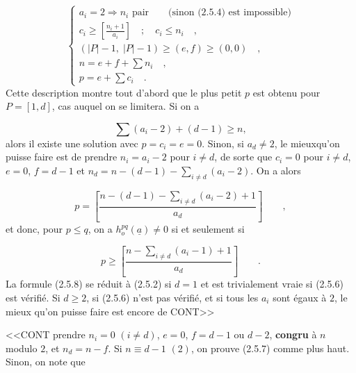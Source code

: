 
\begin{equation}\tag{2.5.5}
\left\{
\begin{array}{l}
a_i = 2 \Longrightarrow n_i \mbox{ pair} \qquad \mbox{(sinon (2.5.4) est impossible)} \\[3mm]
c_i \geq \left[ \displaystyle\frac{n_i+1}{a_i} \right] \quad ; \quad c_i \leq n_i \quad , \\[3mm]
(|P|-1, \; |P|-1) \geq (e,f) \geq (0,0) \quad , \\[3mm]
n = e+f+ \sum n_i \quad , \\[3mm]
p = e + \sum c_i \quad .
\end{array}
\right.
\end{equation}
Cette description montre tout d'abord que le plus petit $p$ est obtenu pour $P = [1,d]$, cas auquel on se limitera. Si on a

\begin{equation}\tag{2.5.6}
\sum (a_i-2) + (d-1) \geq n,
\end{equation}
alors il existe une solution avec $p = c_i = e = 0$. Sinon, si $a_d \neq 2$, le mieuxqu'on puisse faire est de prendre $n_i = a_i - 2$ pour $i \neq d$, de sorte que $c_i = 0$ pour $i \neq d$, $e = 0$, $f = d-1$ et $n_d = n - (d-1) - \sum\limits_{i \neq d} (a_i-2)$. On a alors

\begin{equation}\tag{2.5.7}
p = \left[ \displaystyle\frac{n-(d-1) - \sum\limits_{i \neq d} (a_i-2) + 1}{a_d} \right] \qquad ,
\end{equation}
et donc, pour $p \leq q$, on a $h^{pq}_{o}(\underline{a}) \neq 0$ si et seulement si

\begin{equation}\tag{2.5.8}
p \geq \left[ \displaystyle\frac{n- \sum\limits_{i \neq d} (a_i-1) + 1}{a_d} \right] \qquad .
\end{equation}
La formule (2.5.8) se réduit à (2.5.2) si $d = 1$ et est trivialement vraie si (2.5.6) est vérifié. Si $d \geq 2$, si (2.5.6) n'est pas vérifié, et si tous les $a_i$ sont égaux à $2$, le mieux qu'on puisse faire est encore de CONT>>



<<CONT prendre $n_i = 0$ $(i \neq d)$, $e = 0$, $f = d-1$ ou $d-2$, \textbf{congru} à $n$ modulo $2$, et $n_d = n-f$. Si $n \equiv d-1$ $(2)$, on prouve (2.5.7) comme plus haut. Sinon, on note que

